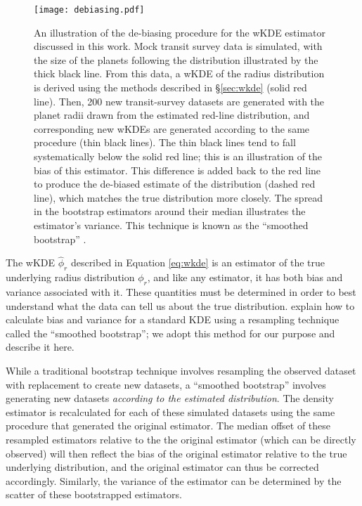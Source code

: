 \documentclass[iop]{emulateapj}
\begin{document}
\begin{figure}[t!]
   \centering
   \texttt{[image: debiasing.pdf]} %
   \caption{An illustration of the de-biasing procedure for the wKDE estimator discussed in this work.  Mock transit survey data is simulated, with the size of the planets following the distribution illustrated by the thick black line.  From this data, a wKDE of the radius distribution is derived using the methods described in \S\ref{sec:wkde} (solid red line).  Then, 200 new transit-survey datasets are generated with the planet radii drawn from the estimated red-line distribution, and corresponding new wKDEs are generated according to the same procedure (thin black lines).  The thin black lines tend to fall systematically below the solid red line; this is an illustration of the bias of this estimator.  This difference is added back to the red line to produce the de-biased estimate of the distribution (dashed red line), which matches the true distribution more closely.  The spread in the bootstrap estimators around their median illustrates the estimator's variance.  This technique is known as the ``smoothed bootstrap'' \citep{narsky2013}.}
      \label{fig:debiasing}
\end{figure}


The wKDE $\hat\phi_r$ described in Equation \ref{eq:wkde} is an estimator of the true underlying radius distribution $\phi_r$, and like any estimator, it has both bias and variance associated with it.  These quantities must be determined in order to best understand what the data can tell us about the true distribution.  \citet{narsky2013} explain how to calculate bias and variance for a standard KDE using a resampling technique called the ``smoothed bootstrap''; we adopt this method for our purpose and describe it here.  

While a traditional bootstrap technique involves resampling the observed dataset with replacement to create new datasets, a ``smoothed bootstrap'' involves generating new datasets \textit{according to the estimated distribution}.  The density estimator is recalculated for each of these simulated datasets using the same procedure that generated the original estimator.  The median offset of these resampled estimators relative to the the original estimator (which can be directly observed) will then reflect the bias of the original estimator relative to the true underlying distribution, and the original estimator can thus be corrected accordingly.  Similarly, the variance of the estimator can be determined by the scatter of these bootstrapped estimators.  
\end{document}

